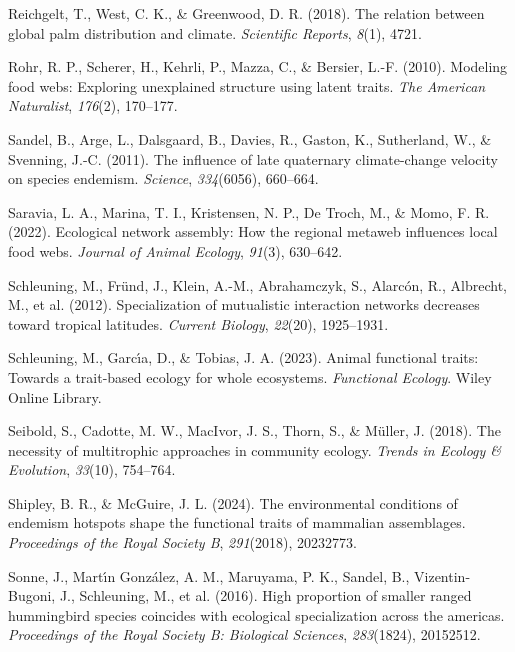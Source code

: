 \documentclass[
]{agujournal2019}
\newlength{\cslhangindent}
\newenvironment{CSLReferences}[2] %
 {\begin{list}{}{%
  \setlength{\itemindent}{0pt}
  \setlength{\leftmargin}{0pt}
  \setlength{\parsep}{0pt}
  \ifodd #1
   \setlength{\leftmargin}{\cslhangindent}
   \setlength{\itemindent}{-1\cslhangindent}
  \fi
  \setlength{\itemsep}{#2\baselineskip}}}
 {\end{list}}
\begin{document}
\begin{CSLReferences}{1}{0}
Reichgelt, T., West, C. K., \& Greenwood, D. R. (2018). The relation
between global palm distribution and climate. \emph{Scientific Reports},
\emph{8}(1), 4721.

Rohr, R. P., Scherer, H., Kehrli, P., Mazza, C., \& Bersier, L.-F.
(2010). Modeling food webs: Exploring unexplained structure using latent
traits. \emph{The American Naturalist}, \emph{176}(2), 170--177.

Sandel, B., Arge, L., Dalsgaard, B., Davies, R., Gaston, K., Sutherland,
W., \& Svenning, J.-C. (2011). The influence of late quaternary
climate-change velocity on species endemism. \emph{Science},
\emph{334}(6056), 660--664.

Saravia, L. A., Marina, T. I., Kristensen, N. P., De Troch, M., \& Momo,
F. R. (2022). Ecological network assembly: How the regional metaweb
influences local food webs. \emph{Journal of Animal Ecology},
\emph{91}(3), 630--642.

Schleuning, M., Fründ, J., Klein, A.-M., Abrahamczyk, S., Alarcón, R.,
Albrecht, M., et al. (2012). Specialization of mutualistic interaction
networks decreases toward tropical latitudes. \emph{Current Biology},
\emph{22}(20), 1925--1931.

Schleuning, M., Garcı́a, D., \& Tobias, J. A. (2023). Animal functional
traits: Towards a trait-based ecology for whole ecosystems.
\emph{Functional Ecology}. Wiley Online Library.

Seibold, S., Cadotte, M. W., MacIvor, J. S., Thorn, S., \& Müller, J.
(2018). The necessity of multitrophic approaches in community ecology.
\emph{Trends in Ecology \& Evolution}, \emph{33}(10), 754--764.

Shipley, B. R., \& McGuire, J. L. (2024). The environmental conditions
of endemism hotspots shape the functional traits of mammalian
assemblages. \emph{Proceedings of the Royal Society B},
\emph{291}(2018), 20232773.

Sonne, J., Martı́n González, A. M., Maruyama, P. K., Sandel, B.,
Vizentin-Bugoni, J., Schleuning, M., et al. (2016). High proportion of
smaller ranged hummingbird species coincides with ecological
specialization across the americas. \emph{Proceedings of the Royal
Society B: Biological Sciences}, \emph{283}(1824), 20152512.


\end{CSLReferences}
\end{document}
